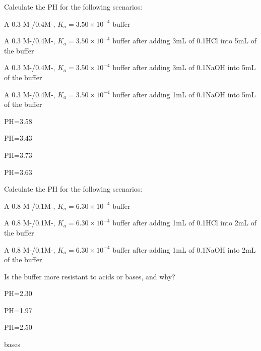 \documentclass[main.tex]{subfiles}
\begin{document}
\begin{multicols*}{2}
\begin{question}[ID=\the\value{numA}]
Calculate the PH for the following scenarios:
\begin{inparaenum}[(a)]
\item A 0.3 M-/0.4M-, $K_a=3.50 \times 10^{-4}$ buffer  %
\item A 0.3 M-/0.4M-, $K_a=3.50 \times 10^{-4}$ buffer after adding 3mL of 0.1HCl into 5mL of the buffer %
\item A 0.3 M-/0.4M-, $K_a=3.50 \times 10^{-4}$ buffer after adding 3mL of 0.1NaOH into 5mL of the buffer %
\item A 0.3 M-/0.4M-, $K_a=3.50 \times 10^{-4}$ buffer after adding 1mL of 0.1NaOH into 5mL of the buffer %
 \end{inparaenum}
\end{question}
\begin{solution}
\begin{inparaenum}[(a)]
\item  PH=3.58 
\item  PH=3.43 
\item  PH=3.73 
\item  PH=3.63 
 \end{inparaenum}
\hspace{0.1cm}\end{solution}%




\begin{question}[ID=\the\value{numA}]
Calculate the PH for the following scenarios:
\begin{inparaenum}[(a)]
\item A 0.8 M-/0.1M-, $K_a=6.30 \times 10^{-4}$ buffer  %
\item A 0.8 M-/0.1M-, $K_a=6.30 \times 10^{-4}$ buffer after adding 1mL of 0.1HCl into 2mL of the buffer %
\item A 0.8 M-/0.1M-, $K_a=6.30 \times 10^{-4}$ buffer after adding 1mL of 0.1NaOH into 2mL of the buffer %
\item Is the buffer more resistant to acids or bases, and why?
 \end{inparaenum}
\end{question}
\begin{solution}
\begin{inparaenum}[(a)]
\item  PH=2.30  
\item PH=1.97 
\item  PH=2.50 
\item bases
 \end{inparaenum}
\hspace{0.1cm}\end{solution}%


\end{multicols*}
\end{document}
